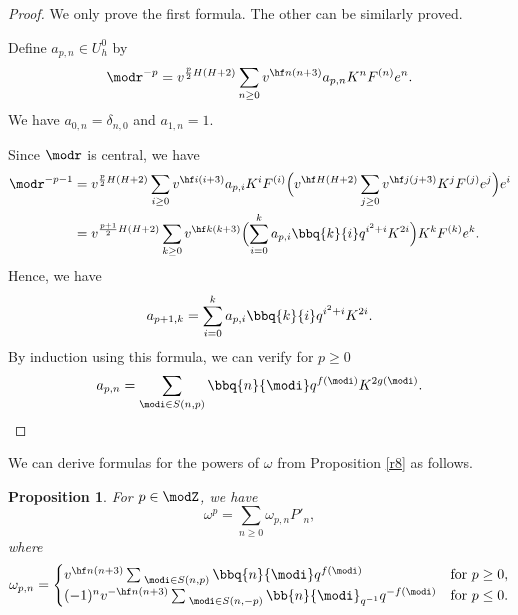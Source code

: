 \documentclass{amsart}
\numberwithin{equation}{section}
\numberwithin{figure}{section}
\theoremstyle{plain}
\newtheorem{proposition}[theorem]{Proposition}
\theoremstyle{definition}
\theoremstyle{remark}
\begin{document}
\begin{proof}
  We only prove the first formula.  The other can be similarly proved.

  Define $a_{p,n}\in U_h^0$ by
  \begin{equation}
    \label{e14}
    \modr ^{-p}
    = v^{\frac p2 H(H+2)}\sum_{n\ge 0}v^{\hf n(n+3)}a_{p,n}
    K^nF^{(n)}e^n.
  \end{equation}
  We have $a_{0,n}=\delta _{n,0}$ and $a_{1,n}=1$.

  Since $\modr $ is central, we have
  \begin{equation*}
    \begin{split}
      \modr ^{-p-1}
      &=v^{\frac p2 H(H+2)}\sum_{i\ge 0}v^{\hf i(i+3)}a_{p,i}
      K^iF^{(i)}
      \Bigl(v^{\hf H(H+2)}\sum_{j\ge 0}v^{\hf j(j+3)}
      K^jF^{(j)}e^j\Bigr) e^i\\
      &=v^{\frac {p+1}2 H(H+2)}
      \sum_{k\ge 0}v^{\hf k(k+3)}
      \Bigl(
      \sum_{i=0}^k a_{p,i} \bbq{k}{i} q^{i^2+i} K^{2i}
      \Bigr)
      K^kF^{(k)}e^{k}.
    \end{split}
  \end{equation*}
  Hence, we have
  \begin{equation*}
    a_{p+1,k}=\sum_{i=0}^k a_{p,i} \bbq{k}{i} q^{i^2+i} K^{2i}.
  \end{equation*}
  By induction using this formula, we can verify for $p\ge 0$
  \begin{equation}
    \label{e16}
    a_{p,n}=\sum_{\modi \in S(n,p)}\bbq{n}{\modi }q^{f(\modi )}K^{2g(\modi )}.
  \end{equation}
\end{proof}

We can derive formulas for the powers of $\omega $ from Proposition
\ref{r8} as follows.

\begin{proposition}
  \label{r5}
  For $p\in \modZ $, we have
  \begin{equation}
    \label{e13}
    \omega ^p = \sum_{n\ge 0} \omega _{p,n}P'_n,
  \end{equation}
  where
  \begin{gather*}
    \omega _{p,n} =
    \begin{cases}
      v^{\hf n(n+3)}
      \sum_{\;\modi \in S(n,p)}\bbq{n}{\modi }q^{f(\modi )}&{\text{for $p\ge 0$}},\\
      (-1)^nv^{-\hf n(n+3)}
      \sum_{\;\modi \in S(n,-p)}\bb{n}{\modi }_{q^{-1}}q^{-f(\modi )}&{\text{for $p\le 0$.}}
    \end{cases}
  \end{gather*}
\end{proposition}
\end{document}
